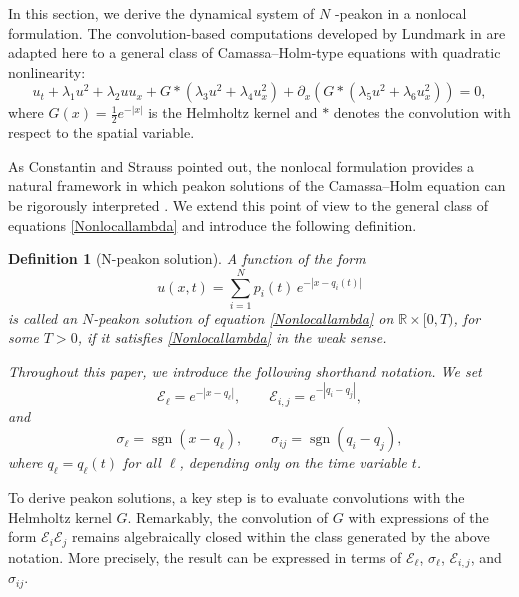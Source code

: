 \documentclass[11pt]{article}
\newtheorem{definition}{Definition}
\begin{document}
In this section, we derive the dynamical system of $N$ -peakon in a nonlocal formulation. The convolution-based computations developed by Lundmark in \cite{lundmark2007formation} are adapted here to a general class of Camassa--Holm-type equations with quadratic nonlinearity:
\begin{equation}
    u_t + \lambda_1 u^2 + \lambda_2 u u_x 
    + G \ast (\lambda_3 u^2 + \lambda_4 u_x^2) 
    + \partial_x \left( G \ast (\lambda_5 u^2 + \lambda_6 u_x^2) \right) = 0,
    \label{Nonlocallambda}
\end{equation}
where $G(x) = \tfrac{1}{2}e^{-|x|}$ is the Helmholtz kernel and $\ast$ denotes the convolution with respect to the spatial variable.

As Constantin and Strauss pointed out, the nonlocal formulation provides a natural framework in which peakon solutions of the Camassa–Holm equation can be rigorously interpreted \cite{constantin2000stability}. We extend this point of view to the general class of equations \eqref{Nonlocallambda} and introduce the following definition.



\begin{definition}[N-peakon solution]
A function of the form
\begin{equation}
u(x,t) = \sum_{i=1}^N p_i(t)\,e^{-|x-q_i(t)|}
\end{equation}
is called an $N$-peakon solution of equation \eqref{Nonlocallambda} on $\mathbb{R}\times [0,T)$, for some $T>0$, if it satisfies \eqref{Nonlocallambda} in the weak sense.

Throughout this paper, we introduce the following shorthand notation. We set
\begin{equation}
\mathcal{E}_\ell = e^{-|x-q_\ell|}, \qquad 
\mathcal{E}_{i,j} = e^{-|q_i-q_j|},
\end{equation}
and
\begin{equation}
\sigma_\ell = \operatorname{sgn}(x-q_\ell), \qquad
\sigma_{ij} = \operatorname{sgn}(q_i-q_j),
\end{equation}
where $q_\ell = q_\ell(t)$ for all $\ell$, depending only on the time variable $t$.
\end{definition}



To derive peakon solutions, a key step is to evaluate convolutions with the Helmholtz kernel $G$. 
Remarkably, the convolution of $G$ with expressions of the form $\mathcal{E}_i \mathcal{E}_j$ remains algebraically closed within the class generated by the above notation. 
More precisely, the result can be expressed in terms of $\mathcal{E}_\ell$, $\sigma_\ell$, $\mathcal{E}_{i,j}$, and $\sigma_{ij}$.
\end{document}
